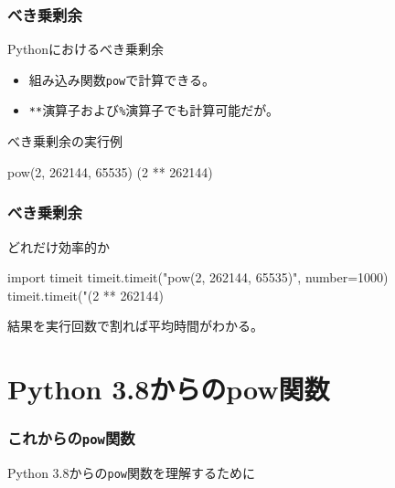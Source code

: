 \documentclass[aspectratio=169,dvipdfmx,14pt,notheorems]{beamer}
\theoremstyle{definition}
\begin{document}
\begin{frame}[fragile]\frametitle{べき乗剰余}

\begin{block}{Pythonにおけるべき乗剰余}
\begin{itemize}
\item 組み込み関数\texttt{pow}で計算できる。
\item \texttt{**}演算子および\texttt{\%}演算子でも計算可能だが。
\end{itemize}
\end{block}

\begin{exampleblock}{べき乗剰余の実行例}

\begin{pyconsole}
pow(2, 262144, 65535)
(2 ** 262144) %
\end{pyconsole}


\end{exampleblock}

\end{frame}

\begin{frame}[fragile]\frametitle{べき乗剰余}

\begin{exampleblock}{どれだけ効率的か}

\begin{pyconsole}
import timeit
timeit.timeit("pow(2, 262144, 65535)", number=1000)
timeit.timeit("(2 ** 262144) %
\end{pyconsole}

\end{exampleblock}
結果を実行回数で割れば平均時間がわかる。

\end{frame}

\section{Python 3.8からのpow関数}

\begin{frame}\frametitle{これからの\texttt{pow}関数}
\begin{center}
\Large Python 3.8からの\texttt{pow}関数を理解するために
\end{center}
\end{frame}
\end{document}

